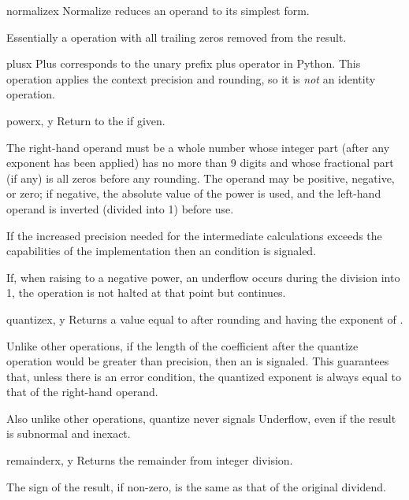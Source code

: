 \begin{methoddesc}{normalize}{x}
  Normalize reduces an operand to its simplest form.

  Essentially a  operation with all trailing zeros removed from
  the result.
\end{methoddesc}
  
\begin{methoddesc}{plus}{x}
  Plus corresponds to the unary prefix plus operator in Python.  This
  operation applies the context precision and rounding, so it is
  \emph{not} an identity operation.
\end{methoddesc}

\begin{methoddesc}{power}{x, y}
  Return  to the  if given.

  The right-hand operand must be a whole number whose integer part (after any
  exponent has been applied) has no more than 9 digits and whose fractional
  part (if any) is all zeros before any rounding. The operand may be positive,
  negative, or zero; if negative, the absolute value of the power is used, and
  the left-hand operand is inverted (divided into 1) before use.

  If the increased precision needed for the intermediate calculations exceeds
  the capabilities of the implementation then an 
  condition is signaled.

  If, when raising to a negative power, an underflow occurs during the
  division into 1, the operation is not halted at that point but continues. 
\end{methoddesc}

\begin{methoddesc}{quantize}{x, y}
  Returns a value equal to  after rounding and having the exponent of
  .

  Unlike other operations, if the length of the coefficient after the quantize
  operation would be greater than precision, then an
   is signaled. This guarantees that, unless there
  is an error condition, the quantized exponent is always equal to that of the
  right-hand operand.

  Also unlike other operations, quantize never signals Underflow, even
  if the result is subnormal and inexact.  
\end{methoddesc} 

\begin{methoddesc}{remainder}{x, y}
  Returns the remainder from integer division.

  The sign of the result, if non-zero, is the same as that of the original
  dividend. 
\end{methoddesc}
 
